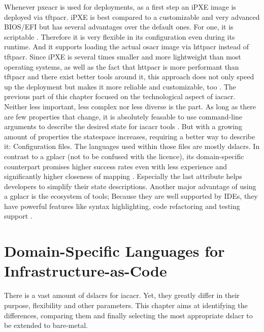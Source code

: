 \newline
Whenever \gls{pxeacr} is used for deployments, as a first step an iPXE image is deployed via \gls{tftpacr}. iPXE is best compared to a customizable and very advanced BIOS/EFI but has several advantages over the default ones. For one, it is scriptable \cite{ipxe_scripting}. Therefore it is very flexible in its configuration even during its runtime. And it supports loading the actual \gls{osacr} image via \gls{httpacr} instead of \gls{tftpacr}. Since iPXE is several times smaller and more lightweight than most operating systems, as well as the fact that \gls{httpacr} is more performant than \gls{tftpacr} and there exist better tools around it, this approach does not only speed up the deployment but makes it more reliable and customizable, too \cite{ipxe_uefi_http} \cite{why_ipxe} \cite{foreman_ipxe} \cite{jpmens_network_boot_http}.
\newline\smallskip
The previous part of this chapter focused on the technological  aspect of \gls{iacacr}. Neither less important, less complex nor less diverse is the  part.
\newline
As long as there are few properties that change, it is absolutely feasable to use command-line arguments to describe the desired state for \gls{iacacr} tools \cite{iac_oreilly}. But with a growing amount of properties the statespace increases, requiring a better way to describe it: Configuration files. The languages used within those files are mostly \gls{dslacr}s. In contrast to a \gls{gplacr} (not to be confused with the licence), its domain-specific counterpart promises higher success rates even with less experience and significantly higher closeness of mapping \cite{comparing_gpl_dsl}. Especially the last attribute helps developers to simplify their state descriptions. Another major advantage of using a \gls{gplacr} is the ecosystem of tools; Because they are well supported by IDEs, they have powerful features like syntax highlighting, code refactoring and testing support \cite{iac_oreilly}.

\section{Domain-Specific Languages for Infrastructure-as-Code} %
There is a vast amount of \gls{dslacr}s for \gls{iacacr}. Yet, they greatly differ in their purpose, flexibility and other parameters. This chapter aims at identifying the differences, comparing them and finally selecting the most appropriate \gls{dslacr} to be extended to bare-metal.

